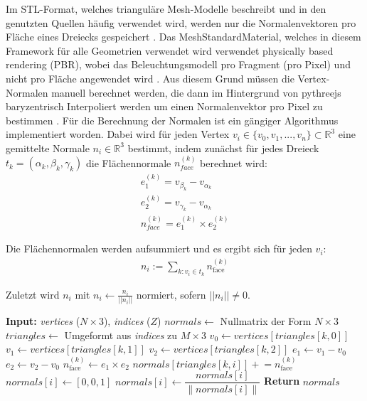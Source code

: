 Im STL-Format, welches trianguläre Mesh-Modelle beschreibt und in den genutzten Quellen häufig verwendet wird, werden nur die Normalenvektoren pro Fläche eines Dreiecks gespeichert .
Das MeshStandardMaterial, welches in diesem Framework für alle Geometrien verwendet wird verwendet physically based rendering (PBR),
wobei das Beleuchtungsmodell pro Fragment (pro Pixel) und nicht pro Fläche angewendet wird .
Aus diesem Grund müssen die Vertex-Normalen manuell berechnet werden,
die dann im Hintergrund von pythreejs baryzentrisch Interpoliert werden um einen Normalenvektor pro Pixel zu bestimmen .
Für die Berechnung der Normalen ist ein gängiger Algorithmus implementiert worden.
Dabei wird für jeden Vertex $v_i \in \{v_0, v_1,...,v_n\} \subset \mathbb{R}^3$ eine gemittelte Normale $n_i \in \mathbb{R}^3$ bestimmt,
indem zunächst für jedes Dreieck $t_k = (\alpha_k,\beta_k,\gamma_k)$ die Flächennormale $n^{(k)}_{face}$ berechnet wird:
\begin{align*}
    e^{(k)}_1 = v_{\beta_k} - v_{\alpha_k}\\
    e^{(k)}_2 = v_{\gamma_k} - v_{\alpha_k}\\
    n^{(k)}_{face} = e^{(k)}_1 \times e^{(k)}_2
\end{align*}

Die Flächennormalen werden aufsummiert und es ergibt sich für jeden $v_i$:
\begin{align*}
    n_i := \sum_{k : v_i \in t_k} n^{(k)}_{\text{face}} 
\end{align*}

Zuletzt wird $n_i$ mit $n_i \leftarrow \frac{n_i}{||n_i||}$ normiert, sofern $||n_i|| \neq 0$.


\vspace{1em}
\begin{algorithm}[H]
    \caption{Berechnung von Vertex-Normalen}
    \begin{algorithmic}[1]
        \State \textbf{Input:} \textit{vertices} ($N \times 3$), \textit{indices} ($Z$)
        \State $normals \gets$ Nullmatrix der Form $N \times 3$
        \State $triangles \gets$ Umgeformt aus \textit{indices} zu $M \times 3$
            \State $v_0 \gets vertices[triangles[k, 0]]$
            \State $v_1 \gets vertices[triangles[k, 1]]$
            \State $v_2 \gets vertices[triangles[k, 2]]$
            \State $e_1 \gets v_1 - v_0$
            \State $e_2 \gets v_2 - v_0$
            \State $n_{\text{face}}^{(k)} \gets e_1 \times e_2$
                \State $normals[triangles[k, i]] \mathrel{+}= n_{\text{face}}^{(k)}$
            \EndFor
        \EndFor
                \State $normals[i] \gets [0, 0, 1]$ 
            \Else
                \State $normals[i] \gets \dfrac{normals[i]}{\|normals[i]\|}$
            \EndIf
        \EndFor
        \State \textbf{Return} $normals$
    \end{algorithmic}
\end{algorithm}
\vspace{1em}



